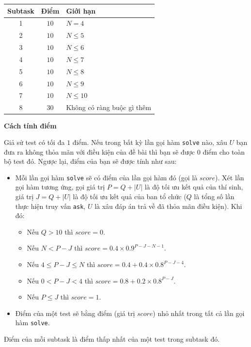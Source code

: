 \begin{center}
  \begin{tabular}{|c|c|l|} \hline
    \textbf{Subtask} & \textbf{Điểm} & \textbf{Giới hạn} \\ \hline
    1 & $10$ & $N=4$ \\ \hline
    2 & $10$ & $N\le 5$ \\ \hline
    3 & $10$ & $N\le 6$ \\ \hline
    4 & $10$ & $N\le 7$ \\ \hline
    5 & $10$ & $N\le 8$ \\ \hline
    6 & $10$ & $N\le 9$ \\ \hline
    7 & $10$ & $N\le 10$ \\ \hline
    8 & $30$ & Không có ràng buộc gì thêm \\ \hline
  \end{tabular}
\end{center}

\textbf{Cách tính điểm}

Giả sử test có tối đa $1$ điểm. Nếu trong bất kỳ lần gọi hàm \texttt{solve} nào, xâu $U$ bạn đưa ra không thỏa mãn với điều kiện của đề bài thì bạn sẽ được $0$ điểm cho toàn bộ test đó. Ngược lại, điểm của bạn sẽ được tính như sau:
\begin{itemize}
   \item Mỗi lần gọi hàm \texttt{solve} sẽ có điểm của lần gọi hàm đó (gọi là $score$). Xét lần gọi hàm tương ứng, gọi giá trị $P=Q+|U|$ là độ tối ưu kết quả của thí sinh, giá trị $J=Q+|U|$ là độ tối ưu kết quả của ban tổ chức ($Q$ là tổng số lần thực hiện truy vấn \texttt{ask}, $U$ là xâu đáp án trả về đã thỏa mãn điều kiện). Khi đó:
   \begin{itemize}
      \item Nếu $Q>10$ thì $score=0$.
      \item Nếu $N<P-J$ thì $score=0.4\times 0.9^{P-J-N-1}$.
      \item Nếu $4\le P-J\le N$ thì $score=0.4+0.4\times 0.8^{P-J-4}$.
      \item Nếu $0<P-J<4$ thì $score=0.8+0.2\times 0.8^{P-J}$.
      \item Nếu $P\le J$ thì $score=1$.
   \end{itemize}
   \item Điểm của một test sẽ bằng điểm (giá trị $score$) nhỏ nhất trong tất cả lần gọi hàm \texttt{solve}.
\end{itemize}

Điểm của mỗi subtask là điểm thấp nhất của một test trong subtask đó.